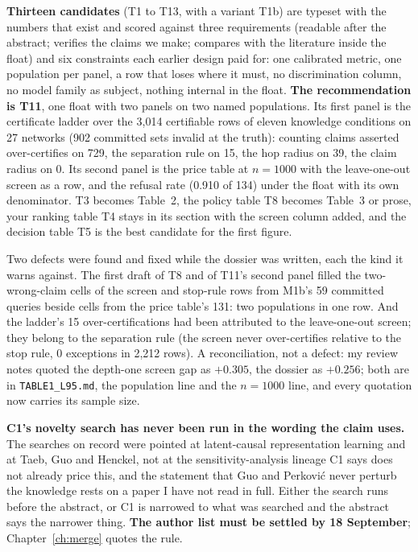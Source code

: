 \textbf{Thirteen candidates} (T1 to T13, with a variant T1b) are typeset with the numbers that exist and
scored against three requirements (readable after the abstract; verifies the claims we make; compares
with the literature inside the float) and six constraints each earlier design paid
for: one calibrated metric, one population per panel, a row that loses where it must, no discrimination
column, no model family as subject, nothing internal in the float. \textbf{The recommendation is T11},
one float with two panels on two named populations. Its first panel is the certificate ladder over the
3,014 certifiable rows of eleven knowledge conditions on 27 networks (902 committed sets invalid at the
truth): counting claims asserted over-certifies on 729, the separation rule on 15, the hop radius on 39,
the claim radius on 0. Its second panel is the price table at $n = 1000$ with the leave-one-out screen as
a row, and the refusal rate (0.910 of 134) under the float with its own denominator. T3 becomes Table~2,
the policy table T8 becomes Table~3 or prose, your ranking table T4 stays in its section with the screen
column added, and the decision table T5 is the best candidate for the first figure.

Two defects were found and fixed while the dossier was written, each the kind it warns against. The
first draft of T8 and of T11's second panel filled the two-wrong-claim cells of the screen and
stop-rule rows from M1b's 59 committed queries beside cells from the price table's 131: two populations
in one row. And the ladder's 15 over-certifications had been attributed to the leave-one-out screen;
they belong to the separation rule (the screen never over-certifies relative to the stop rule, 0
exceptions in 2,212 rows). A reconciliation, not a defect: my review notes quoted the depth-one screen
gap as $+0.305$, the dossier as $+0.256$; both are in \texttt{TABLE1\_L95.md}, the population line and
the $n = 1000$ line, and every quotation now carries its sample size.

\begin{noprato}
\textbf{C1's novelty search has never been run in the wording the claim uses.} The searches on record
were pointed at latent-causal representation learning and at Taeb, Guo and Henckel, not at the
sensitivity-analysis lineage C1 says does not already price this, and the statement that Guo and Perkovi\'c never
perturb the knowledge rests on a paper I have not read in full. Either the search runs before the
abstract, or C1 is narrowed to what was searched and the abstract says the narrower thing.
\textbf{The author list must be settled by 18 September}; Chapter~\ref{ch:merge} quotes the rule.
\end{noprato}


